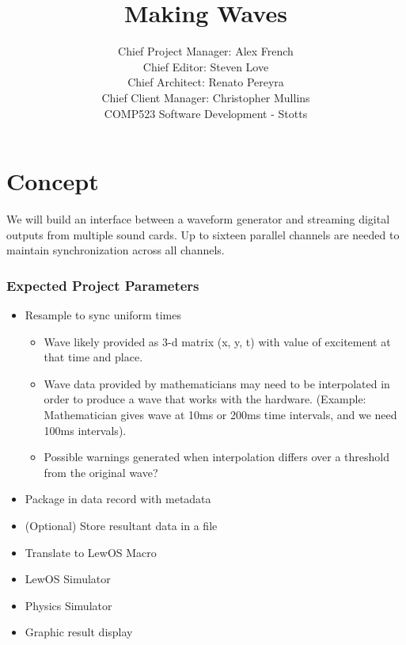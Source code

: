 \documentclass[12pt]{article}
\begin{document}

\title{Making Waves}%
\author{Chief Project Manager: Alex French \\ 
Chief Editor: Steven Love\\
Chief Architect: Renato Pereyra\\
Chief Client Manager: Christopher Mullins\\ %
COMP523 Software Development - Stotts} %

\maketitle

\section{Concept}

We will build an interface between a waveform generator and streaming digital outputs from multiple sound cards. Up to sixteen parallel channels are needed to maintain synchronization across all channels.

\subsubsection{Expected Project Parameters}
\begin{itemize}
\item Resample to sync uniform times
\begin{itemize}
  \item Wave likely provided as 3-d matrix (x, y, t) with value of excitement at that time and place.
	\item Wave data provided by mathematicians may need to be interpolated in order to produce a wave that works with the hardware. (Example: Mathematician gives wave at 10ms or 200ms time intervals, and we need 100ms intervals).
	\item Possible warnings generated when interpolation differs over a threshold from the original wave?

\end{itemize}
\item Package in data record with metadata
\item (Optional) Store resultant data in a file
\item Translate to LewOS Macro
\item LewOS Simulator
\item Physics Simulator
\item Graphic result display
\end{itemize}
\end{document}
